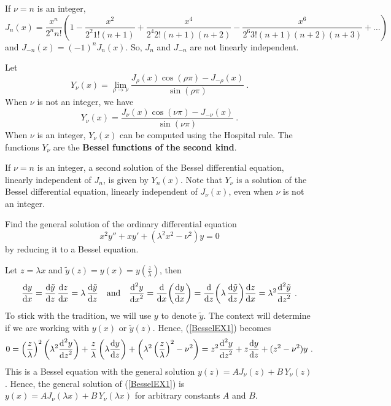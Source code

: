 If $\nu = n$ is an integer,
\[
J_n(x)
= \frac{x^n}{2^n n!} \left( 1 - \frac{x^2}{2^2 1! (n+1)} +
\frac{x^4}{2^4 2! (n+1)(n+2)} - \frac{x^6}{2^6 3! (n+1)(n+2)(n+3)} +
\dots \right)
\]
and $J_{-n}(x) = (-1)^n J_n(x)$.  So, $J_n$ and $J_{-n}$ are not
linearly independent.

Let
\[
Y_\nu(x) = \lim_{\rho \rightarrow \nu}
\frac{J_{\rho}(x) \cos(\rho \pi) - J_{-\rho}(x)}{\sin(\rho \pi)} \  .
\]
When $\nu$ is not an integer, we have
\[
Y_\nu(x) = \frac{J_{\nu}(x) \cos(\nu \pi) - J_{-\nu}(x)}{\sin(\nu \pi)} \  .
\]
When $\nu$ is an integer, $Y_\nu(x)$ can be computed using the
Hospital rule.  The functions $Y_\nu$ are the {\bfseries Bessel
functions of the second kind}.

If $\nu = n$ is an integer, a second solution of the Bessel
differential equation, linearly independent of $J_n$, is given 
by $Y_n(x)$.  Note that $Y_\nu$ is a solution of the Bessel
differential equation, linearly independent of $J_\nu(x)$, even when
$\nu$ is not an integer.

\begin{egg}
Find the general solution of the ordinary differential equation
\begin{equation}\label{BesselEX1}
x^2 y'' + xy' + (\lambda^2 x^2 - \nu^2)y = 0
\end{equation}
by reducing it to a Bessel equation.

Let $z=\lambda x$ and
$\displaystyle \tilde{y}(z) = y(x) = y\left(\frac{z}{\lambda}\right)$,
then
\[
\dydx{y}{x} = \dydx{\tilde{y}}{z}\,\dydx{z}{x}
= \lambda\, \dydx{\tilde{y}}{z} \quad \text{and} \quad
\dydxn{y}{x}{2} = \dfdx{\left( \dydx{y}{x} \right)}{x}
= \dfdx{\left( \lambda\,\dydx{\tilde{y}}{z} \right)}{z} \dydx{z}{x}
= \lambda^2 \dydxn{\tilde{y}}{z}{2} \ .
\]
To stick with the tradition, we will use $y$ to denote $\tilde{y}$.
The context will determine if we are working with $y(x)$ or
$\tilde{y}(z)$.  Hence, (\ref{BesselEX1}) becomes
\[
0 = \left(\frac{z}{\lambda}\right)^2 \left( \lambda^2 \dydxn{y}{z}{2}\right)
+ \frac{z}{\lambda} \left(\lambda \dydx{y}{z}\right)
+\left( \lambda^2 \left(\frac{z}{\lambda}\right)^2 - \nu^2\right)
= z^2 \dydxn{y}{z}{2} + z \dydx{y}{z} + (z^2 - \nu^2) y \ .
\]
This is a Bessel equation with the general solution
$y(z) = A J_\nu(z) + B\,Y_\nu(z)$.  Hence,
the general solution of (\ref{BesselEX1}) is
$\displaystyle y(x) = A J_\nu(\lambda x) + B\,Y_\nu(\lambda x)$
for arbitrary constants $A$ and $B$.
\end{egg}

